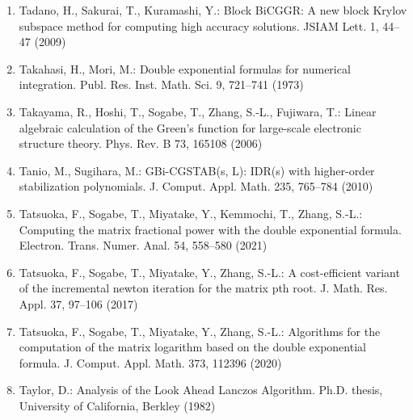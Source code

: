 \begin{enumerate}[label=\arabic*.,ref=\arabic*,leftmargin=3em]
\item\label{bib:source-182}Tadano, H., Sakurai, T., Kuramashi, Y.: Block BiCGGR: A new block Krylov subspace method for computing high accuracy solutions. JSIAM Lett. 1, 44–47 (2009)

\item\label{bib:source-183}Takahasi, H., Mori, M.: Double exponential formulas for numerical integration. Publ. Res. Inst. Math. Sci. 9, 721–741 (1973)

\item\label{bib:source-184}Takayama, R., Hoshi, T., Sogabe, T., Zhang, S.-L., Fujiwara, T.: Linear algebraic calculation of the Green’s function for large-scale electronic structure theory. Phys. Rev. B 73, 165108 (2006)

\item\label{bib:source-185}Tanio, M., Sugihara, M.: GBi-CGSTAB(s, L): IDR(s) with higher-order stabilization polynomials. J. Comput. Appl. Math. 235, 765–784 (2010)

\item\label{bib:source-186}Tatsuoka, F., Sogabe, T., Miyatake, Y., Kemmochi, T., Zhang, S.-L.: Computing the matrix fractional power with the double exponential formula. Electron. Trans. Numer. Anal. 54, 558–580 (2021)

\item\label{bib:source-187}Tatsuoka, F., Sogabe, T., Miyatake, Y., Zhang, S.-L.: A cost-efficient variant of the incremental newton iteration for the matrix pth root. J. Math. Res. Appl. 37, 97–106 (2017)

\item\label{bib:source-188}Tatsuoka, F., Sogabe, T., Miyatake, Y., Zhang, S.-L.: Algorithms for the computation of the matrix logarithm based on the double exponential formula. J. Comput. Appl. Math. 373, 112396 (2020)

\item\label{bib:source-189}Taylor, D.: Analysis of the Look Ahead Lanczos Algorithm. Ph.D. thesis, University of California, Berkley (1982)


\end{enumerate}
